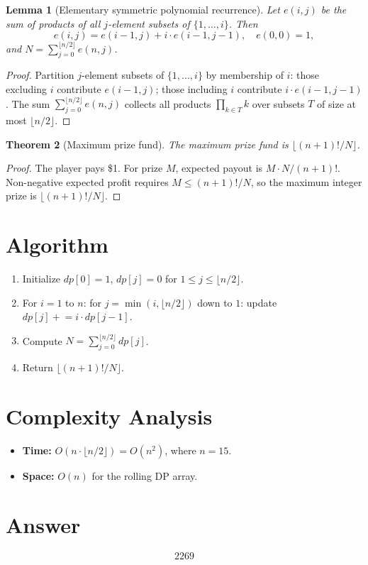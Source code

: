 \documentclass[11pt,a4paper]{article}
\newtheorem{theorem}{Theorem}
\newtheorem{lemma}[theorem]{Lemma}
\begin{document}
\begin{lemma}[Elementary symmetric polynomial recurrence]
Let $e(i,j)$ be the sum of products of all $j$-element subsets of $\{1,\ldots,i\}$. Then
\[
e(i,j) = e(i-1,j) + i \cdot e(i-1,j-1), \quad e(0,0) = 1,
\]
and $N = \sum_{j=0}^{\lfloor n/2 \rfloor} e(n,j)$.
\end{lemma}

\begin{proof}
Partition $j$-element subsets of $\{1,\ldots,i\}$ by membership of $i$: those excluding $i$ contribute $e(i-1,j)$; those including $i$ contribute $i \cdot e(i-1,j-1)$. The sum $\sum_{j=0}^{\lfloor n/2\rfloor} e(n,j)$ collects all products $\prod_{k \in T} k$ over subsets $T$ of size at most $\lfloor n/2 \rfloor$.
\end{proof}

\begin{theorem}[Maximum prize fund]
The maximum prize fund is $\lfloor (n+1)!/N \rfloor$.
\end{theorem}

\begin{proof}
The player pays \$1. For prize $M$, expected payout is $M \cdot N/(n+1)!$. Non-negative expected profit requires $M \le (n+1)!/N$, so the maximum integer prize is $\lfloor (n+1)!/N \rfloor$.
\end{proof}

\section{Algorithm}

\begin{enumerate}
\item Initialize $dp[0] = 1$, $dp[j] = 0$ for $1 \le j \le \lfloor n/2 \rfloor$.
\item For $i = 1$ to $n$: for $j = \min(i, \lfloor n/2 \rfloor)$ down to $1$: update $dp[j] \mathrel{+}= i \cdot dp[j-1]$.
\item Compute $N = \sum_{j=0}^{\lfloor n/2 \rfloor} dp[j]$.
\item Return $\lfloor (n+1)!/N \rfloor$.
\end{enumerate}

\section{Complexity Analysis}

\begin{itemize}
\item \textbf{Time:} $O(n \cdot \lfloor n/2 \rfloor) = O(n^2)$, where $n = 15$.
\item \textbf{Space:} $O(n)$ for the rolling DP array.
\end{itemize}

\section{Answer}

\[
\boxed{2269}
\]
\end{document}

